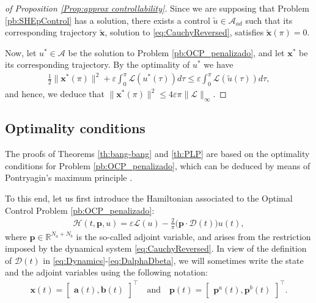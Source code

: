 \documentclass[9pt,shortpaper,twoside,web]{ieeecolor}
\begin{document}
\medskip 
\begin{proof}[of Proposition \ref{Prop:approx controllability}]
	Since we are supposing that Problem \ref{pb:SHEpControl} has a solution, there exists a control $\tilde{u}\in \mathcal{A}_{ad}$ such that its corresponding trajectory $\tilde{\bm{x}}$, solution to \eqref{eq:CauchyReversed}, satisfies $\tilde{\bm{x}}(\pi) = 0$. 
	
	Now, let $u^\ast\in \mathcal{A}$ be the solution to Problem \ref{pb:OCP_penalizado}, and let $\bm{x}^\ast$ be its corresponding trajectory. By the optimality of $u^\ast$ we have
	\begin{align*}
		\frac{1}{2} \| \bm{x}^\ast(\pi)\|^2 +\varepsilon \int_0^\pi \mathcal{L}(u^\ast(\tau))d\tau \leq \varepsilon \int_0^\pi \mathcal{L}(\tilde{u}(\tau))d\tau,
	\end{align*}
	and hence, we deduce that $\| \bm{x}^\ast (\pi)\|^2 \leq 4 \varepsilon \pi \| \mathcal{L}\|_\infty.$
\end{proof}

\subsection{Optimality conditions}\label{sec:opti cond}

The proofs of Theorems \ref{th:bang-bang} and \ref{th:PLP} are based on the optimality conditions for Problem \ref{pb:OCP_penalizado}, which can be deduced by means of Pontryagin's maximum principle \cite[Chapter~2.7]{bryson1975applied}.

To this end, let us first introduce the Hamiltonian  associated to the Optimal Control Problem \ref{pb:OCP_penalizado}:
\begin{align}\label{eq:hamil}
	\mathcal{H}(t,\bm{p},u) = \varepsilon \mathcal{L}(u) - \frac 2\pi\big(\bm{p} \cdot \bm{\mathcal{D}}(t)\big)u(t),
\end{align}
where $\bm{p}\in \mathbb{R}^{N_a+N_b}$ is the so-called adjoint variable, and arises from the restriction imposed by the dynamical system \eqref{eq:CauchyReversed}. In view of the definition of $\bm{\mathcal{D}}(t)$ in \eqref{eq:Dynamics}-\eqref{eq:DalphaDbeta}, we will sometimes write the state and the adjoint variables using the following notation:
\begin{align*}
	\bm{x}(t) = \begin{bmatrix} \bm{a}(t), \bm{b}(t) \end{bmatrix}^\top \quad \text{and}\quad
	\bm{p}(t) = \begin{bmatrix} \bm{p}^a(t), \bm{p}^b(t) \end{bmatrix}^\top.
\end{align*}
\end{document}
